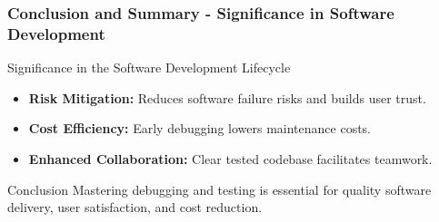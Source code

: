 \documentclass{beamer}
\begin{document}
\begin{frame}[fragile]
    \frametitle{Conclusion and Summary - Significance in Software Development}
    \begin{block}{Significance in the Software Development Lifecycle}
        \begin{itemize}
            \item \textbf{Risk Mitigation:} Reduces software failure risks and builds user trust.
            \item \textbf{Cost Efficiency:} Early debugging lowers maintenance costs.
            \item \textbf{Enhanced Collaboration:} Clear tested codebase facilitates teamwork.
        \end{itemize}
    \end{block}

    \begin{block}{Conclusion}
        Mastering debugging and testing is essential for quality software delivery, user satisfaction, and cost reduction.
    \end{block}
\end{frame}
\end{document}
